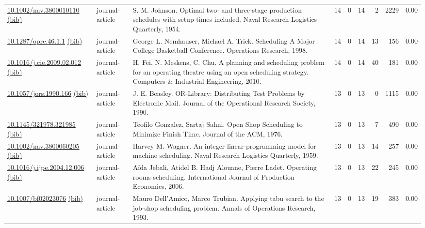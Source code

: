 {\begin{longtable}{p{5cm}lp{11cm}rrrrrr}
\href{http://dx.doi.org/10.1002/nav.3800010110}{10.1002/nav.3800010110} \href{https://www.doi2bib.org/bib/10.1002/nav.3800010110}{(bib)} & journal-article & S. M. Johnson. Optimal two‐ and three‐stage production schedules with setup times included. Naval Research Logistics Quarterly, 1954. & 14 & 0 & 14 & 2 & 2229 &  0.00\\
\href{http://dx.doi.org/10.1287/opre.46.1.1}{10.1287/opre.46.1.1} \href{https://www.doi2bib.org/bib/10.1287/opre.46.1.1}{(bib)} & journal-article & George L. Nemhauser, Michael A. Trick. Scheduling A Major College Basketball Conference. Operations Research, 1998. & 14 & 0 & 14 & 13 & 156 &  0.00\\
\href{http://dx.doi.org/10.1016/j.cie.2009.02.012}{10.1016/j.cie.2009.02.012} \href{https://www.doi2bib.org/bib/10.1016/j.cie.2009.02.012}{(bib)} & journal-article & H. Fei, N. Meskens, C. Chu. A planning and scheduling problem for an operating theatre using an open scheduling strategy. Computers \& Industrial Engineering, 2010. & 14 & 0 & 14 & 40 & 181 &  0.00\\
\href{http://dx.doi.org/10.1057/jors.1990.166}{10.1057/jors.1990.166} \href{https://www.doi2bib.org/bib/10.1057/jors.1990.166}{(bib)} & journal-article & J. E. Beasley. OR-Library: Distributing Test Problems by Electronic Mail. Journal of the Operational Research Society, 1990. & 13 & 0 & 13 & 0 & 1115 &  0.00\\
\href{http://dx.doi.org/10.1145/321978.321985}{10.1145/321978.321985} \href{https://www.doi2bib.org/bib/10.1145/321978.321985}{(bib)} & journal-article & Teofilo Gonzalez, Sartaj Sahni. Open Shop Scheduling to Minimize Finish Time. Journal of the ACM, 1976. & 13 & 0 & 13 & 7 & 490 &  0.00\\
\href{http://dx.doi.org/10.1002/nav.3800060205}{10.1002/nav.3800060205} \href{https://www.doi2bib.org/bib/10.1002/nav.3800060205}{(bib)} & journal-article & Harvey M. Wagner. An integer linear‐programming model for machine scheduling. Naval Research Logistics Quarterly, 1959. & 13 & 0 & 13 & 14 & 257 &  0.00\\
\href{http://dx.doi.org/10.1016/j.ijpe.2004.12.006}{10.1016/j.ijpe.2004.12.006} \href{https://www.doi2bib.org/bib/10.1016/j.ijpe.2004.12.006}{(bib)} & journal-article & Aïda Jebali, Atidel B. Hadj Alouane, Pierre Ladet. Operating rooms scheduling. International Journal of Production Economics, 2006. & 13 & 0 & 13 & 22 & 245 &  0.00\\
\href{http://dx.doi.org/10.1007/bf02023076}{10.1007/bf02023076} \href{https://www.doi2bib.org/bib/10.1007/bf02023076}{(bib)} & journal-article & Mauro Dell'Amico, Marco Trubian. Applying tabu search to the job-shop scheduling problem. Annals of Operations Research, 1993. & 13 & 0 & 13 & 19 & 383 &  0.00\\

\end{longtable}}
